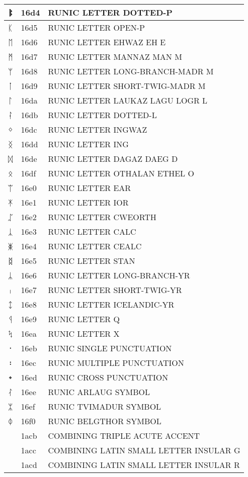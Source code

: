 \documentclass[12pt,letterpaper,openany]{book}
\begin{document}
\begin{center}
\begin{supertabular}{|m{0.25in}|m{0.5in}|m{4in}|}
ᛔ & 16d4 & RUNIC LETTER DOTTED-P\\\hline
ᛕ & 16d5 & RUNIC LETTER OPEN-P\\\hline
ᛖ & 16d6 & RUNIC LETTER EHWAZ EH E\\\hline
ᛗ & 16d7 & RUNIC LETTER MANNAZ MAN M\\\hline
ᛘ & 16d8 & RUNIC LETTER LONG-BRANCH-MADR M\\\hline
ᛙ & 16d9 & RUNIC LETTER SHORT-TWIG-MADR M\\\hline
ᛚ & 16da & RUNIC LETTER LAUKAZ LAGU LOGR L\\\hline
ᛛ & 16db & RUNIC LETTER DOTTED-L\\\hline
ᛜ & 16dc & RUNIC LETTER INGWAZ\\\hline
ᛝ & 16dd & RUNIC LETTER ING\\\hline
ᛞ & 16de & RUNIC LETTER DAGAZ DAEG D\\\hline
ᛟ & 16df & RUNIC LETTER OTHALAN ETHEL O\\\hline
ᛠ & 16e0 & RUNIC LETTER EAR\\\hline
ᛡ & 16e1 & RUNIC LETTER IOR\\\hline
ᛢ & 16e2 & RUNIC LETTER CWEORTH\\\hline
ᛣ & 16e3 & RUNIC LETTER CALC\\\hline
ᛤ & 16e4 & RUNIC LETTER CEALC\\\hline
ᛥ & 16e5 & RUNIC LETTER STAN\\\hline
ᛦ & 16e6 & RUNIC LETTER LONG-BRANCH-YR\\\hline
ᛧ & 16e7 & RUNIC LETTER SHORT-TWIG-YR\\\hline
ᛨ & 16e8 & RUNIC LETTER ICELANDIC-YR\\\hline
ᛩ & 16e9 & RUNIC LETTER Q\\\hline
ᛪ & 16ea & RUNIC LETTER X\\\hline
᛫ & 16eb & RUNIC SINGLE PUNCTUATION\\\hline
᛬ & 16ec & RUNIC MULTIPLE PUNCTUATION\\\hline
᛭ & 16ed & RUNIC CROSS PUNCTUATION\\\hline
ᛮ & 16ee & RUNIC ARLAUG SYMBOL\\\hline
ᛯ & 16ef & RUNIC TVIMADUR SYMBOL\\\hline
ᛰ & 16f0 & RUNIC BELGTHOR SYMBOL\\\hline
◌᫋ & 1acb & COMBINING TRIPLE ACUTE ACCENT\\\hline
◌ᫌ & 1acc & COMBINING LATIN SMALL LETTER INSULAR G\\\hline
◌ᫍ & 1acd & COMBINING LATIN SMALL LETTER INSULAR R\\\hline

\end{supertabular}
\end{center}
\end{document}
